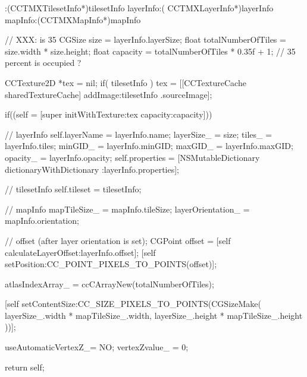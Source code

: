 \begin{DoxyCode}
                         :(CCTMXTilesetInfo*)tilesetInfo layerInfo:(
      CCTMXLayerInfo*)layerInfo mapInfo:(CCTMXMapInfo*)mapInfo
{
        // XXX: is 35%
        CGSize size = layerInfo.layerSize;
        float totalNumberOfTiles = size.width * size.height;
        float capacity = totalNumberOfTiles * 0.35f + 1; // 35 percent is
       occupied ?

        CCTexture2D *tex = nil;
        if( tilesetInfo )
                tex = [[CCTextureCache sharedTextureCache] addImage:tilesetInfo
      .sourceImage];

        if((self = [super initWithTexture:tex capacity:capacity])) {

                // layerInfo
                self.layerName = layerInfo.name;
                layerSize_ = size;
                tiles_ = layerInfo.tiles;
                minGID_ = layerInfo.minGID;
                maxGID_ = layerInfo.maxGID;
                opacity_ = layerInfo.opacity;
                self.properties = [NSMutableDictionary dictionaryWithDictionary
      :layerInfo.properties];

                // tilesetInfo
                self.tileset = tilesetInfo;

                // mapInfo
                mapTileSize_ = mapInfo.tileSize;
                layerOrientation_ = mapInfo.orientation;

                // offset (after layer orientation is set);
                CGPoint offset = [self calculateLayerOffset:layerInfo.offset];
                [self setPosition:CC_POINT_PIXELS_TO_POINTS(offset)];

                atlasIndexArray_ = ccCArrayNew(totalNumberOfTiles);

                [self setContentSize:CC_SIZE_PIXELS_TO_POINTS(CGSizeMake( 
      layerSize_.width * mapTileSize_.width, layerSize_.height * mapTileSize_.height ))];

                useAutomaticVertexZ_= NO;
                vertexZvalue_ = 0;
        }

        return self;
}
\end{DoxyCode}
